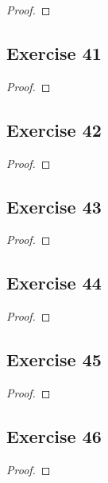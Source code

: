 \documentclass[14pt]{extarticle}
\begin{document}
\begin{proof}

\end{proof}

\subsection{Exercise 41}

\begin{proof}

\end{proof}

\subsection{Exercise 42}

\begin{proof}

\end{proof}

\subsection{Exercise 43}

\begin{proof}

\end{proof}

\subsection{Exercise 44}

\begin{proof}

\end{proof}

\subsection{Exercise 45}

\begin{proof}

\end{proof}

\subsection{Exercise 46}

\begin{proof}

\end{proof}
\end{document}
